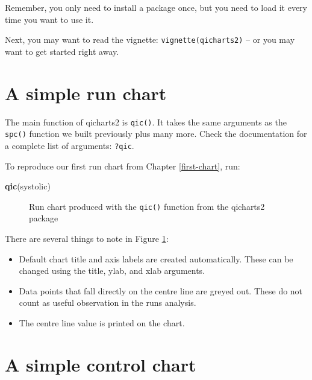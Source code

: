\documentclass[
]{book}
\makeatletter
\newenvironment{Shaded}{\begin{snugshade}}{\end{snugshade}}
\newcommand{\FunctionTok}[1]{\textcolor[rgb]{0.13,0.29,0.53}{\textbf{#1}}}
\newcommand{\NormalTok}[1]{#1}
\newcommand*\pandocbounded[1]{%
  \sbox\pandoc@box{#1}%
  \Gscale@div\@tempa{\textheight}{\dimexpr\ht\pandoc@box+\dp\pandoc@box\relax}%
  \Gscale@div\@tempb{\linewidth}{\wd\pandoc@box}%
  \ifdim\@tempb\p@<\@tempa\p@\let\@tempa\@tempb\fi%
  \ifdim\@tempa\p@<\p@\scalebox{\@tempa}{\usebox\pandoc@box}%
  \else\usebox{\pandoc@box}%
  \fi%
}
\makeatother
\begin{document}
Remember, you only need to install a package once, but you need to load it every time you want to use it.

Next, you may want to read the vignette: \texttt{vignette(\textquotesingle{}qicharts2\textquotesingle{})} -- or you may want to get started right away.

\section{A simple run chart}\label{a-simple-run-chart}

The main function of qicharts2 is \texttt{qic()}. It takes the same arguments as the \texttt{spc()} function we built previously plus many more. Check the documentation for a complete list of arguments: \texttt{?qic}.

To reproduce our first run chart from Chapter \ref{first-chart}, run:

\begin{Shaded}
\begin{Highlighting}[]
\FunctionTok{qic}\NormalTok{(systolic)}
\end{Highlighting}
\end{Shaded}

\begin{figure}
\centering
\pandocbounded{}
\caption{\label{fig:qicharts-qic1}Run chart produced with the \texttt{qic()} function from the qicharts2 package}
\end{figure}

There are several things to note in Figure \ref{fig:qicharts-qic1}:

\begin{itemize}
\item
  Default chart title and axis labels are created automatically. These can be changed using the title, ylab, and xlab arguments.
\item
  Data points that fall directly on the centre line are greyed out. These do not count as useful observation in the runs analysis.
\item
  The centre line value is printed on the chart.
\end{itemize}

\section{A simple control chart}\label{a-simple-control-chart}
\end{document}
